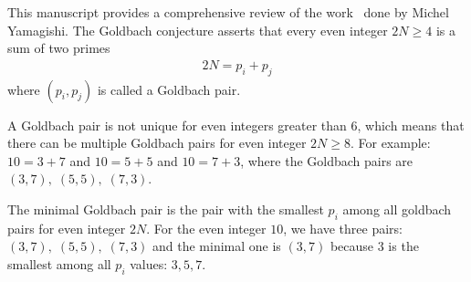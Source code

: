 This manuscript provides a comprehensive review of the work~\cite{yamagishi2025goldbach} done by Michel Yamagishi.
The Goldbach conjecture asserts that every even integer $2N \geq 4$ is a sum of two primes
\begin{align*}
    2N = p_i + p_j
\end{align*}
where $(p_i, p_j)$ is called a Goldbach pair.

A Goldbach pair is not unique for even integers greater than 6,
which means that there can be multiple Goldbach pairs for even integer $2N \geq 8$.
For example: $10=3+7$ and $10=5+5$ and $10=7+3$, where the Goldbach pairs are $(3,7), \; (5,5), \; (7,3)$.

The minimal Goldbach pair is the pair with the smallest $p_i$ among all goldbach pairs for even integer $2N$.
For the even integer $10$, we have three pairs: $(3,7), \; (5,5), \; (7,3)$
and the minimal one is $(3,7)$ because
$3$ is the smallest among all $p_i$ values: $3, 5, 7$.


